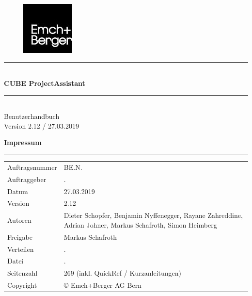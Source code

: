 \documentclass[12pt]{article} %
\newcommand{\HRule}{\rule{\linewidth}{0.5mm}} %
\begin{document}

\begin{titlepage}


\begin{figure}[t] %
\flushright  %
\includegraphics[width=0.2\linewidth]{0_EmBeLogo}
\end{figure}

\vspace*{6cm}

\center %

\HRule \\[0.4cm]
{ \huge \bfseries CUBE ProjectAssistant}\\[0.4cm] %
\HRule \\[1.5cm]

\textsf{\Large Benutzerhandbuch}\\[0.5cm] %
\textsf{\large Version 2.12 / 27.03.2019}\\[0.5cm] %

\pagebreak

\flushleft\textbf{ Impressum}
\rule{\textwidth}{1pt}
\begin{flushright}
\begin{flushleft}

\end{flushleft}
\end{flushright}
\begin{tabular}{lp{12cm}}
Auftragsnummer & BE.N.\\
Auftraggeber & .\\
Datum & 27.03.2019\\
Version & 2.12\\
Autoren & Dieter Schopfer, Benjamin Nyffenegger, Rayane Zahreddine, Adrian Johner, Markus Schafroth, Simon Heimberg\\
Freigabe & Markus Schafroth\\
Verteilen & .\\
Datei & .\\
Seitenzahl & 269 (inkl. QuickRef / Kurzanleitungen)\\
Copyright & \copyright{ Emch+Berger AG Bern}\\
\end{tabular}

\vfill %

\end{titlepage}
\end{document}
